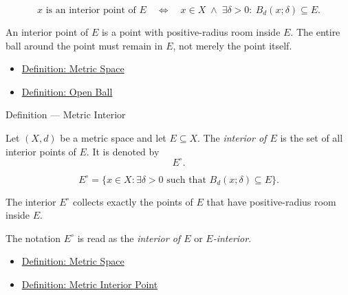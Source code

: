 \begin{remark*}
\[
x\text{ is an interior point of }E
\quad\Longleftrightarrow\quad
x\in X
\;\land\;
\exists\delta>0{:}\ B_d(x;\delta)\subseteq E.
\]
\end{remark*}

\begin{remark*}[Interpretation]
An interior point of \(E\) is a point with positive-radius room inside \(E\).
The entire ball around the point must remain in \(E\), not merely the point
itself.
\end{remark*}

\begin{dependencies}
\begin{itemize}
  \item \hyperref[def:metric-space]{Definition: Metric Space}
  \item \hyperref[def:metric-open-ball]{Definition: Open Ball}
\end{itemize}
\end{dependencies}

\begin{definitionbox}{Definition --- Metric Interior}
\begin{definition}\label{def:metric-interior}
Let \((X,d)\) be a
 metric space and let \(E\subseteq X\).  The \emph{interior
of \(E\)} is the set of all interior points of \(E\).  It is denoted by
\[
  E^\circ.
\]
\end{definition}
\end{definitionbox}

\begin{remark*}
\[
E^\circ
=
\{x\in X:\exists\delta>0\text{ such that }B_d(x;\delta)\subseteq E\}.
\]
\end{remark*}

\begin{remark*}[Interpretation]
The interior \(E^\circ\) collects exactly the points of \(E\) that have
positive-radius room inside \(E\).
\end{remark*}

\begin{remark*}[Notation]
The notation \(E^\circ\) is read as the \emph{interior of \(E\)} or
\emph{\(E\)-interior}.
\end{remark*}

\begin{dependencies}
\begin{itemize}
  \item \hyperref[def:metric-space]{Definition: Metric Space}
  \item \hyperref[def:metric-interior-point]{Definition: Metric Interior Point}
\end{itemize}
\end{dependencies}

